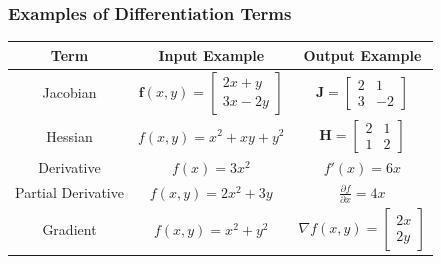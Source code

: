 \documentclass[handout]{beamer}
\begin{document}
\begin{frame}
    \frametitle{Examples of Differentiation Terms}

    \begin{table}[h]
        \centering
        \begin{tabular}{|c|c|c|}
            \hline
            \textbf{Term}      & \textbf{Input Example}                          & \textbf{Output Example}                       \\
            \hline
            Jacobian           & $\mathbf{f}(x, y) = \begin{bmatrix} 2x + y \\ 3x - 2y \end{bmatrix}$ & $\mathbf{J} = \begin{bmatrix} 2 & 1 \\ 3 & -2 \end{bmatrix}$     \\
            \hline
            Hessian            & $f(x, y) = x^2 + xy + y^2$                      & $\mathbf{H} = \begin{bmatrix} 2 & 1 \\ 1 & 2 \end{bmatrix}$     \\
            \hline
            Derivative         & $f(x) = 3x^2$                                   & $f'(x) = 6x$                                  \\
            \hline
            Partial Derivative & $f(x, y) = 2x^2 + 3y$                           & $\frac{\partial f}{\partial x} = 4x$          \\
            \hline
            Gradient           & $f(x, y) = x^2 + y^2$                           & $\nabla f(x, y) = \begin{bmatrix} 2x \\ 2y \end{bmatrix}$ \\
            \hline
        \end{tabular}
    \end{table}

\end{frame}
\end{document}
